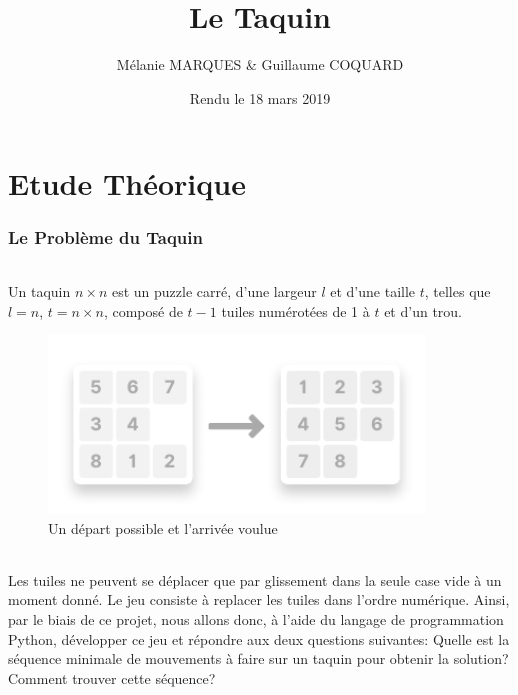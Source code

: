 \documentclass[10pt,a4paper]{report}
\title{\Huge{\textbf{Le Taquin}}}
\author{Mélanie MARQUES \& Guillaume COQUARD}
\date{Rendu le 18 mars 2019}
\begin{document}
\begin{titlepage}
\maketitle
\end{titlepage}


\part{Etude Théorique}

\section{Le Problème du Taquin}

\paragraph{} {Un taquin ${n \times n}$ est un puzzle carré, d'une largeur ${l}$ et d'une taille ${t}$, telles que ${l = n}$, ${t = n \times n}$, composé de ${t - 1}$ tuiles numérotées de 1 à ${t}$ et d’un trou.}

\begin{figure}[!h]
\centering
\includegraphics[keepaspectratio=true,width=10cm]{./inc/media/presentation_twoTaquins.pdf}
\caption{Un départ possible et l'arrivée voulue}
\label{presentationTwoTaquins}
\end{figure}

\paragraph{} {Les tuiles ne peuvent se déplacer que par glissement dans la seule case vide à un moment donné. Le jeu consiste à replacer les tuiles dans l’ordre numérique. Ainsi, par le biais de ce projet, nous allons donc, à l'aide du langage de programmation {\ttfamily Python}, développer ce jeu et répondre aux deux questions suivantes: Quelle est la séquence minimale de mouvements à faire sur un taquin pour obtenir la solution? Comment trouver cette séquence?}
\end{document}
